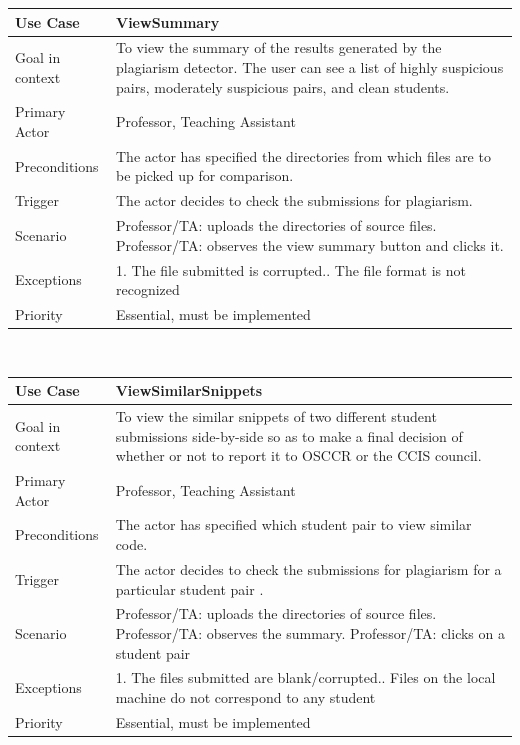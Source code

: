 \documentclass[12pt]{article}
\begin{document}
\begin{tabular}{ |p{3cm}||p{11.25cm}| }
 \hline
 \textbf{Use Case} & \textbf{ViewSummary}\\
 \hline
 Goal in context & To view the summary of the results generated by the plagiarism detector. The user can see a list of highly suspicious pairs, moderately suspicious pairs, and clean students.\\
 \hline
 Primary Actor & Professor, Teaching Assistant \\
 \hline
 Preconditions& The actor has specified the directories from which files are to be picked up for comparison. \\
 \hline
 Trigger &The actor decides to check the submissions for plagiarism.\\
 \hline
 Scenario    &Professor/TA: uploads the directories of source files.\newline
Professor/TA: observes the view summary button and clicks it.\\
\hline
 Exceptions&  
1. The file submitted is corrupted.\newline
2. The file format is not recognized 
\\
\hline
 Priority& Essential, must be implemented \\
 \hline
\end{tabular} \\[2.0 em]


\begin{tabular}{ |p{3cm}||p{11.25cm}| }
 \hline
 \textbf{Use Case} & \textbf{ViewSimilarSnippets}\\
 \hline
 Goal in context & To view the similar snippets of two different student submissions side-by-side so as to make a final decision of whether or not to report it to OSCCR or the CCIS council.\\
 \hline
 Primary Actor & Professor, Teaching Assistant \\
 \hline
 Preconditions& The actor has specified which student pair to view similar code.\\
 \hline
 Trigger &The actor decides to check the submissions for plagiarism for a particular student pair .\\
 \hline
 Scenario    &Professor/TA: uploads the directories of source files.\newline
Professor/TA: observes the summary.\newline
Professor/TA: clicks on a student pair\\
\hline
 Exceptions&  
1. The files submitted are blank/corrupted.\newline
2. Files on the local machine do not correspond to any student
\\
\hline
 Priority& Essential, must be implemented \\
 \hline
\end{tabular} \\[2.0 em]
\end{document}
